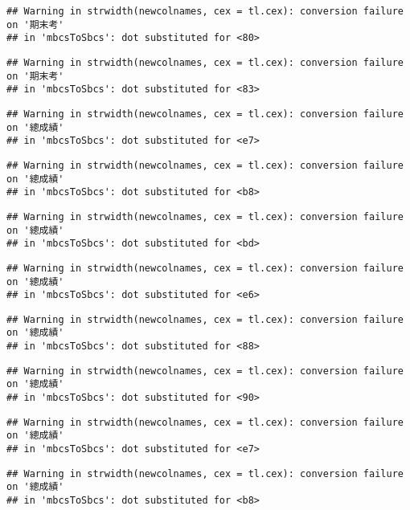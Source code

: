 \documentclass[
]{book}
\begin{document}
\begin{verbatim}
## Warning in strwidth(newcolnames, cex = tl.cex): conversion failure on '期末考'
## in 'mbcsToSbcs': dot substituted for <80>
\end{verbatim}

\begin{verbatim}
## Warning in strwidth(newcolnames, cex = tl.cex): conversion failure on '期末考'
## in 'mbcsToSbcs': dot substituted for <83>
\end{verbatim}

\begin{verbatim}
## Warning in strwidth(newcolnames, cex = tl.cex): conversion failure on '總成績'
## in 'mbcsToSbcs': dot substituted for <e7>
\end{verbatim}

\begin{verbatim}
## Warning in strwidth(newcolnames, cex = tl.cex): conversion failure on '總成績'
## in 'mbcsToSbcs': dot substituted for <b8>
\end{verbatim}

\begin{verbatim}
## Warning in strwidth(newcolnames, cex = tl.cex): conversion failure on '總成績'
## in 'mbcsToSbcs': dot substituted for <bd>
\end{verbatim}

\begin{verbatim}
## Warning in strwidth(newcolnames, cex = tl.cex): conversion failure on '總成績'
## in 'mbcsToSbcs': dot substituted for <e6>
\end{verbatim}

\begin{verbatim}
## Warning in strwidth(newcolnames, cex = tl.cex): conversion failure on '總成績'
## in 'mbcsToSbcs': dot substituted for <88>
\end{verbatim}

\begin{verbatim}
## Warning in strwidth(newcolnames, cex = tl.cex): conversion failure on '總成績'
## in 'mbcsToSbcs': dot substituted for <90>
\end{verbatim}

\begin{verbatim}
## Warning in strwidth(newcolnames, cex = tl.cex): conversion failure on '總成績'
## in 'mbcsToSbcs': dot substituted for <e7>
\end{verbatim}

\begin{verbatim}
## Warning in strwidth(newcolnames, cex = tl.cex): conversion failure on '總成績'
## in 'mbcsToSbcs': dot substituted for <b8>
\end{verbatim}
\end{document}
